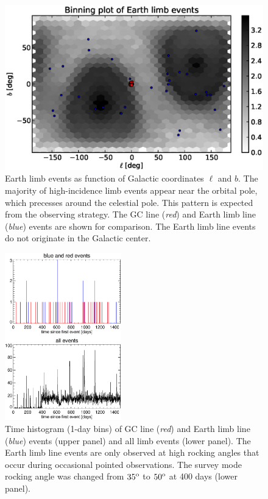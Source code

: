 \documentclass[aps,twocolumn,prd,superscriptaddress,showpacs,nofootinbib,fixfloat]{revtex4}
\newcommand{\degree}{^{\rm o}}
\begin{document}
\begin{figure}
  \centering
  \includegraphics[width=1.0\linewidth]{plots/limb_l_b.eps}
  \caption{Earth limb events as function of Galactic coordinates $\ell$
  and $b$.  The majority of high-incidence limb events appear near the orbital
  pole, which precesses around the celestial pole. This pattern is expected
  from the observing strategy.  The GC line (\emph{red}) and Earth limb line
  (\emph{blue}) events are shown for comparison. The Earth limb line events do
  not originate in the Galactic center.}
  \label{fig:l-b}
\end{figure}

\begin{figure}
  \centering
  \includegraphics[width=0.45\textwidth]{plots/timehist.ps}
  \caption{Time histogram (1-day bins) of GC line (\emph{red}) and Earth limb
    line (\emph{blue}) events (upper panel) and all limb events (lower panel).
    The Earth limb line events are only observed at high rocking angles that
    occur during occasional pointed observations. The survey mode rocking
    angle was changed from $35\degree$ to $50\degree$ at 400 days (lower
    panel).}
  \label{fig:timehist}
\end{figure}
\end{document}
